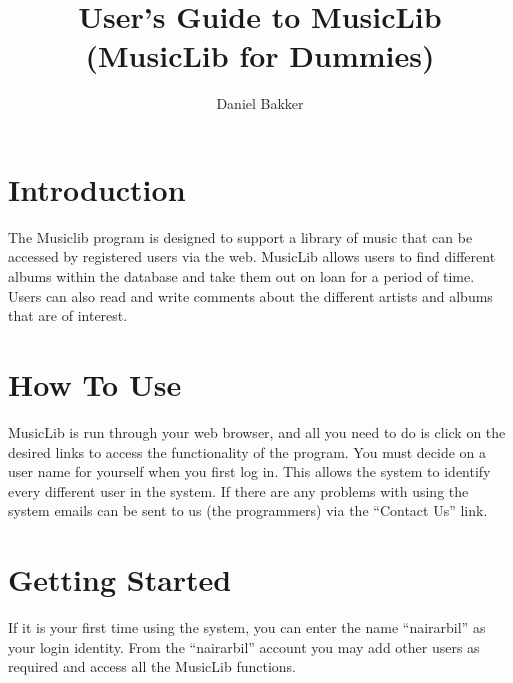 \documentclass{article}
\title{User's Guide to MusicLib (MusicLib for Dummies)}
\author{Daniel Bakker}
\begin{document}
\maketitle
\tableofcontents
\newpage
\section{Introduction}
The Musiclib program is designed to support a library of music that can be accessed by registered users via the web. MusicLib allows users to find different albums within the database and take them out on loan for a period of time. Users can also read and write comments about the different artists and albums that are of interest.

\section{How To Use}
MusicLib is run through your web browser, and all you need to do is click on the desired links to access the functionality of the program. You must decide on a user name for yourself when you first log in. This allows the system to identify every different user in the system. If there are any problems with using the system emails can be sent to us (the programmers) via the ``Contact Us'' link. 
\section{Getting Started}
If it is your first time using the system, you can enter the name ``nairarbil'' as your login identity. From the ``nairarbil'' account you may add other users as required and access all the MusicLib functions. 
\end{document}
